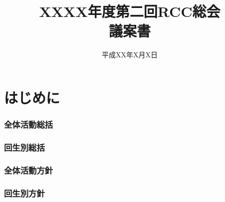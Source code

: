 \documentclass[a4j,titlepage]{jarticle}
\title{{\Huge XXXX年度第二回RCC総会\\議案書}}
\date{平成XX年X月X日}
\begin{document}
\maketitle
\tableofcontents

\newpage
\part*{はじめに}


\newpage
\section{全体活動総括}

\section{回生別総括}





\newpage
\section{全体活動方針}

\section{回生別方針}





\newpage

\end{document}
